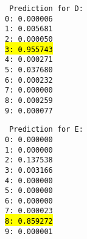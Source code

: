 \begin{latin}
	\noindent\begin{multicols}{2}
		\texttt{%
			Prediction for D:\\
			0: 0.000006\\
			1: 0.005681\\
			2: 0.000050\\
			\hl{3: 0.955743}\\
			4: 0.000271\\
			5: 0.037680\\
			6: 0.000232\\
			7: 0.000000\\
			8: 0.000259\\
			9: 0.000077
		}
		
		
		\texttt{%
			Prediction for E:\\
			0: 0.000000\\
			1: 0.000000\\
			2: 0.137538\\
			3: 0.003166\\
			4: 0.000000\\
			5: 0.000000\\
			6: 0.000000\\
			7: 0.000023\\
			\hl{8: 0.859272}\\
			9: 0.000001
		}
	\end{multicols}
\end{latin}
